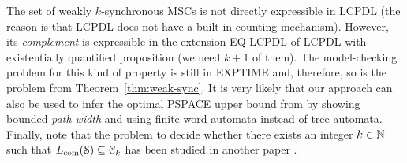 \documentclass[a4paper,UKenglish,cleveref, autoref, thm-restate]{lipics-v2021}
\begin{document}
\begin{remark}
The set of weakly $k$-synchronous MSCs is not directly expressible in LCPDL
(the reason is that LCPDL does not have a built-in counting mechanism).
However, its \emph{complement} is expressible in the extension EQ-LCPDL of LCPDL with
existentially quantified proposition \cite{DBLP:journals/corr/abs-1904-06942} (we need $k+1$ of them). The model-checking problem for
this kind of property is still in EXPTIME and, therefore, so is the problem from
Theorem~\ref{thm:weak-sync}. It is very likely that our approach can also be used to
infer the optimal PSPACE upper bound from \cite{DBLP:conf/cav/BouajjaniEJQ18}
by showing bounded \emph{path width} and using finite word automata instead of tree automata.
Finally, note that
the problem to decide whether there exists an integer $k \in \mathbb{N}$ such that  $L_{\textup{com}}(\mathcal{S}) \subseteq \mathcal{C}_k$ has been studied in another paper \cite{}.
\end{remark}
\end{document}
